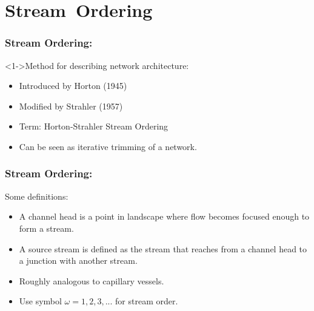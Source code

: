 \section{Stream\ Ordering}

\begin{frame}[label=]
  \frametitle{Stream Ordering:}

  \begin{block}<1->{Method for describing network architecture:}
    \begin{itemize}
    \item<2->
      Introduced by Horton (1945)\cite{horton1945a}
    \item<3-> 
      Modified by Strahler (1957)\cite{strahler1952a}
    \item<4-> 
      Term: Horton-Strahler Stream Ordering\cite{rodriguez-iturbe1997a}
    \item<5->
      Can be seen as \alert{iterative trimming} of a network.
    \end{itemize}
  \end{block}

\end{frame}

\begin{frame}[label=]
  \frametitle{Stream Ordering:}

  \begin{block}{Some definitions:}
    \begin{itemize}
    \item<1-> A \alert{channel head} is a point in landscape
      where flow becomes focused enough to form a stream.
    \item<2-> A \alert{source stream} is defined as the 
      stream that reaches from a channel head
      to a junction with another stream.
    \item<3-> Roughly analogous to capillary vessels.
    \item<4-> Use symbol $\omega=1, 2, 3, ...$ for stream order.
    \end{itemize}
    
  \end{block}

\end{frame}

